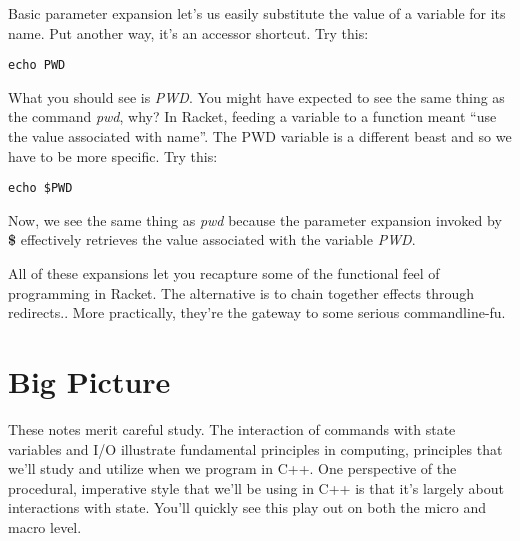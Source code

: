 \documentclass[]{tufte-handout}
\begin{document}
Basic parameter expansion let's us easily substitute the value of a variable for its name. Put another way, it's an accessor shortcut. Try this:
\begin{verbatim}
echo PWD
\end{verbatim}
What you should see is \textit{PWD}.  You might have expected to see the same thing as the command \textit{pwd}, why? In Racket, feeding a variable to a function meant ``use the value associated with name''.  The PWD variable is a different beast and so we have to be more specific. Try this:
\begin{verbatim}
echo $PWD
\end{verbatim}
Now, we see the same thing as \textit{pwd} because the parameter expansion invoked by \textbf{\$} effectively retrieves the value associated with the variable \textit{PWD}. 

All of these expansions let you recapture some of the functional feel of programming in Racket.  The alternative is to chain together effects through redirects..  More practically, they're the gateway to some serious commandline-fu. 


\section{Big Picture}

These notes merit careful study. The interaction of commands with state variables and I/O illustrate fundamental principles in computing, principles that we'll study and utilize when we program in C++. One perspective of the procedural, imperative style that we'll be using in C++ is that it's largely about interactions with state. You'll quickly see this play out on both the micro and macro level. 
\end{document}
